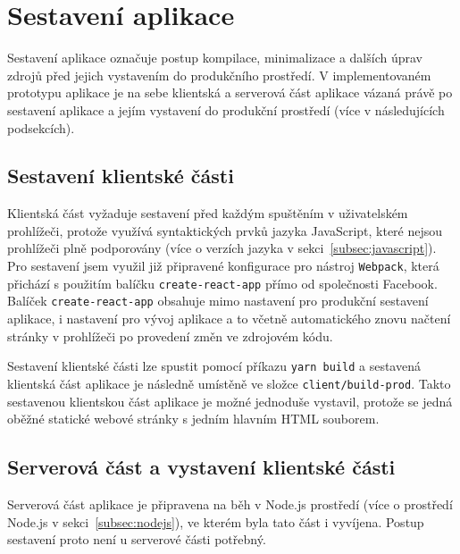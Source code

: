 
\section{Sestavení aplikace}\label{sec:sestaveníAplikace}

Sestavení aplikace označuje postup kompilace, minimalizace a dalších úprav zdrojů před jejich vystavením do produkčního prostředí.
V implementovaném prototypu aplikace je na sebe klientská a serverová část aplikace vázaná právě po sestavení aplikace a jejím vystavení do produkční prostředí (více v následujících podsekcích).

\subsection{Sestavení klientské části}\label{subsec:sestaveníKlientskéČásti}

Klientská část vyžaduje sestavení před každým spuštěním v uživatelském prohlížeči, protože využívá syntaktických prvků jazyka JavaScript, které nejsou prohlížeči plně podporovány (více o verzích jazyka v sekci~\ref{subsec:javascript}).
Pro sestavení jsem využil již připravené konfigurace pro nástroj \texttt{Webpack}, která přichází s použitím balíčku \texttt{create-react-app} přímo od společnosti Facebook.
Balíček \texttt{create-react-app} obsahuje mimo nastavení pro produkční sestavení aplikace, i nastavení pro vývoj aplikace a to včetně automatického znovu načtení stránky v prohlížeči po provedení změn ve zdrojovém kódu.

Sestavení klientské části lze spustit pomocí příkazu \texttt{yarn build} a sestavená klientská část aplikace je následně umístěně ve složce \texttt{client/build-prod}.
Takto sestavenou klientskou část aplikace je možné jednoduše vystavil, protože se jedná oběžné statické webové stránky s jedním hlavním \gls{HTML} souborem.

\subsection{Serverová část a vystavení klientské části}\label{subsec:serverováČástAVystaveníKlientskéČásti}

Serverová část aplikace je připravena na běh v Node.js prostředí (více o prostředí Node.js v sekci~\ref{subsec:nodejs}), ve kterém byla tato část i vyvíjena.
Postup sestavení proto není u serverové části potřebný.

